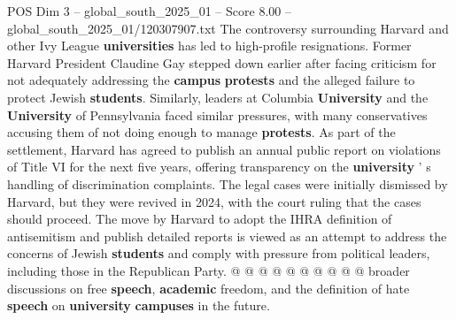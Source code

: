 \begin{textsample}{POS Dim 3 – global\_south\_2025\_01 – Score 8.00 – global\_south\_2025\_01/120307907.txt}
The controversy surrounding Harvard and other Ivy League \textbf{universities} has led to high-profile resignations.
Former Harvard President Claudine Gay stepped down earlier after facing criticism for not adequately addressing the \textbf{campus} \textbf{protests} and the alleged failure to protect Jewish \textbf{students}.
Similarly, leaders at Columbia \textbf{University} and the \textbf{University} of Pennsylvania faced similar pressures, with many conservatives accusing them of not doing enough to manage \textbf{protests}.
As part of the settlement, Harvard has agreed to publish an annual public report on violations of Title VI for the next five years, offering transparency on the \textbf{university} ' s handling of discrimination complaints.
The legal cases were initially dismissed by Harvard, but they were revived in 2024, with the court ruling that the cases should proceed.
The move by Harvard to adopt the IHRA definition of antisemitism and publish detailed reports is viewed as an attempt to address the concerns of Jewish \textbf{students} and comply with pressure from political leaders, including those in the Republican Party. @ @ @ @ @ @ @ @ @ @ broader discussions on free \textbf{speech}, \textbf{academic} freedom, and the definition of hate \textbf{speech} on \textbf{university} \textbf{campuses} in the future.

\end{textsample}
